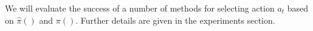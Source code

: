We will evaluate the success of a number of methods for selecting action $a_t$
based on $\hat \pi()$ and $\pi()$. Further details are given in the experiments section.

